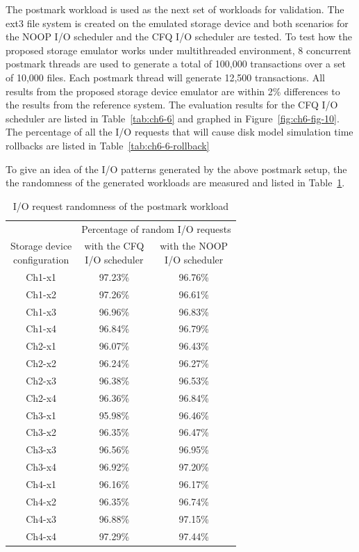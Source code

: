 The postmark workload is used as the next set of workloads for validation. The ext3 file system is created on the emulated storage device and both scenarios for the NOOP I/O scheduler and the CFQ I/O scheduler are tested. To test how the proposed storage emulator works under multithreaded environment, 8 concurrent postmark threads are used to generate a total of 100,000 transactions over a set of 10,000 files. Each postmark thread will generate 12,500 transactions. All results from the proposed storage device emulator are within 2\% differences to the results from the reference system. The evaluation results for the CFQ I/O scheduler are listed in Table~\ref{tab:ch6-6} and graphed in Figure~\ref{fig:ch6-fig-10}. The percentage of all the I/O requests that will cause disk model simulation time rollbacks are listed in Table~\ref{tab:ch6-6-rollback}  

To give an idea of the I/O patterns generated by the above postmark setup, the the randomness of the generated workloads are measured and listed in Table~\ref{tab:ch6-postmark-randomness}.

\begin{table}[htbp]%
	\centering
	\caption{I/O request randomness of the postmark workload}\label{tab:ch6-postmark-randomness}
	\noindent\begin{tabular}{ccc}
		\toprule
		&\multicolumn{2}{c}{Percentage of random I/O requests}\\
		\cmidrule(lr){2-3}
		\parbox{3cm}{\centering Storage device \\ configuration} &
		\parbox{4cm}{\centering with the CFQ\\I/O scheduler}&
		\parbox{4cm}{\centering with the NOOP\\I/O scheduler}\\
		
		\midrule
		Ch1-x1 & 97.23\% & 96.76\% \\
		Ch1-x2 & 97.26\% & 96.61\% \\
		Ch1-x3 & 96.96\% & 96.83\% \\
		Ch1-x4 & 96.84\% & 96.79\% \\
		Ch2-x1 & 96.07\% & 96.43\% \\
		Ch2-x2 & 96.24\% & 96.27\% \\
		Ch2-x3 & 96.38\% & 96.53\% \\
		Ch2-x4 & 96.36\% & 96.84\% \\
		Ch3-x1 & 95.98\% & 96.46\% \\
		Ch3-x2 & 96.35\% & 96.47\% \\
		Ch3-x3 & 96.56\% & 96.95\% \\
		Ch3-x4 & 96.92\% & 97.20\% \\
		Ch4-x1 & 96.16\% & 96.17\% \\
		Ch4-x2 & 96.35\% & 96.74\% \\
		Ch4-x3 & 96.88\% & 97.15\% \\
		Ch4-x4 & 97.29\% & 97.44\% \\
		\bottomrule
	\end{tabular}
\end{table}%


